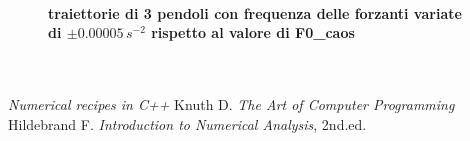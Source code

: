 \documentclass[11pt]{article}
\begin{document}
\begin{figure}[!h]
\caption{}
\paragraph{traiettorie di 3 pendoli con frequenza delle forzanti  variate di $\pm0.00005 \, s^{-2}$ rispetto al valore di F0\_caos}
\label{fig:caosomega}
\centering
{}\,
\end{figure}

\clearpage
\begin{thebibliography}{99}
\emph{Numerical recipes in C++}
Knuth D. \emph{The Art of Computer Programming}
Hildebrand F. \emph{Introduction to Numerical Analysis}, 2nd.ed.
\end{thebibliography}
\end{document}
